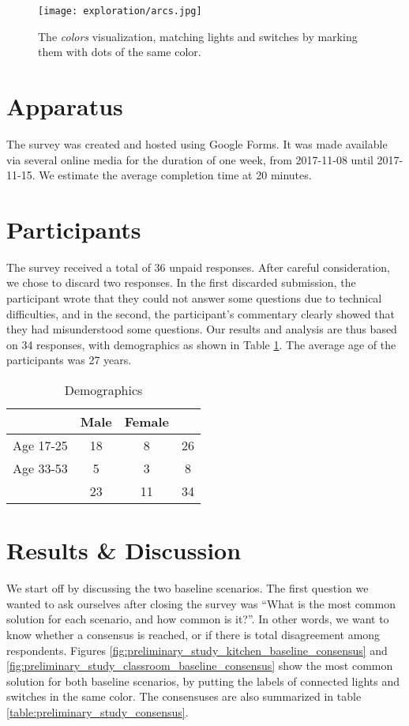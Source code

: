 \begin{figure}
    \centering
    \texttt{[image: exploration/arcs.jpg]}
    \caption{The \textit{colors} visualization, matching lights and switches by marking them with dots of the same color.}
    \label{fig:explor:arcs_vis}
\end{figure}

\section{Apparatus} \label{sec:explor:apparatus}
The survey was created and hosted using Google Forms. It was made available via several online media for the duration of one week, from 2017-11-08 until 2017-11-15. We estimate the average completion time at 20 minutes.

\section{Participants} \label{subsec:explor:participants}
The survey received a total of 36 unpaid responses. After careful consideration, we chose to discard two responses. In the first discarded submission, the participant wrote that they could not answer some questions due to technical difficulties, and in the second, the participant's commentary clearly showed that they had misunderstood some questions. Our results and analysis are thus based on 34 responses, with demographics as shown in Table \ref{table:explor:demographics}. The average age of the participants was 27 years.

    \begin{table}
    \centering
        \begin{tabular}{|c|c c|c|} 
        \hline
                  & Male & Female &    \\
        \hline
        Age 17-25 &   18 &      8 & 26 \\
        Age 33-53 &    5 &      3 &  8 \\
        \hline
                  &   23 &     11 & 34 \\
        \hline
        \end{tabular}
    \caption{Demographics}
    \label{table:explor:demographics}
    \end{table}

\section{Results \& Discussion} \label{sec:explor:res_disc}
We start off by discussing the two baseline scenarios. The first question we wanted to ask ourselves after closing the survey was ``What is the most common solution for each scenario, and how common is it?''. In other words, we want to know whether a consensus is reached, or if there is total disagreement among respondents. Figures \ref{fig:preliminary_study_kitchen_baseline_consensus} and \ref{fig:preliminary_study_classroom_baseline_consensus} show the most common solution for both baseline scenarios, by putting the labels of connected lights and switches in the same color. The consensuses are also summarized in table \ref{table:preliminary_study_consensus}.

